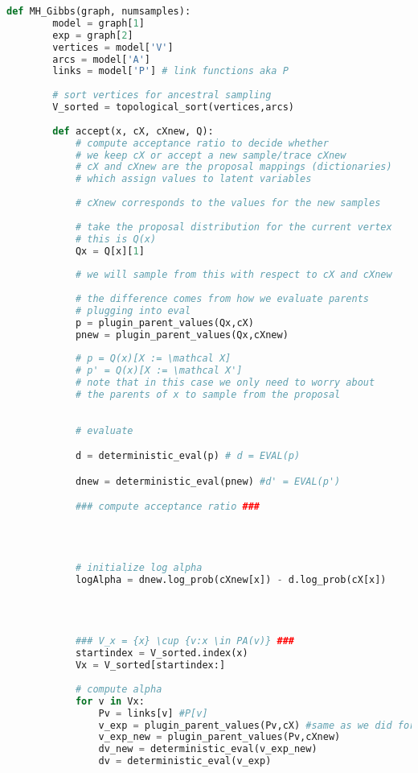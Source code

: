 \documentclass[12pt]{article}%
\theoremstyle{definition}
\begin{document}
	
	\begin{lstlisting}[language=Python]
	def MH_Gibbs(graph, numsamples):
	    model = graph[1]
	    exp = graph[2]
	    vertices = model['V']
	    arcs = model['A']
	    links = model['P'] # link functions aka P
	
	    # sort vertices for ancestral sampling
	    V_sorted = topological_sort(vertices,arcs)
	
	    def accept(x, cX, cXnew, Q):
	        # compute acceptance ratio to decide whether
	        # we keep cX or accept a new sample/trace cXnew
	        # cX and cXnew are the proposal mappings (dictionaries)
	        # which assign values to latent variables
	
	        # cXnew corresponds to the values for the new samples
	
	        # take the proposal distribution for the current vertex
	        # this is Q(x)
	        Qx = Q[x][1]
	
	        # we will sample from this with respect to cX and cXnew
	
	        # the difference comes from how we evaluate parents 
	        # plugging into eval
	        p = plugin_parent_values(Qx,cX)
	        pnew = plugin_parent_values(Qx,cXnew)
	
	        # p = Q(x)[X := \mathcal X]
	        # p' = Q(x)[X := \mathcal X']
	        # note that in this case we only need to worry about
	        # the parents of x to sample from the proposal
	
	
	        # evaluate 

	        d = deterministic_eval(p) # d = EVAL(p)

	        dnew = deterministic_eval(pnew) #d' = EVAL(p')

	        ### compute acceptance ratio ###
			

	
	
	        # initialize log alpha
	        logAlpha = dnew.log_prob(cXnew[x]) - d.log_prob(cX[x])

	
	
	
	        ### V_x = {x} \cup {v:x \in PA(v)} ###
	        startindex = V_sorted.index(x)
	        Vx = V_sorted[startindex:]
	
	        # compute alpha
	        for v in Vx:
	            Pv = links[v] #P[v]
	            v_exp = plugin_parent_values(Pv,cX) #same as we did for p and pnew
	            v_exp_new = plugin_parent_values(Pv,cXnew)
	            dv_new = deterministic_eval(v_exp_new)
	            dv = deterministic_eval(v_exp)
	            

\end{lstlisting}
\end{document}
